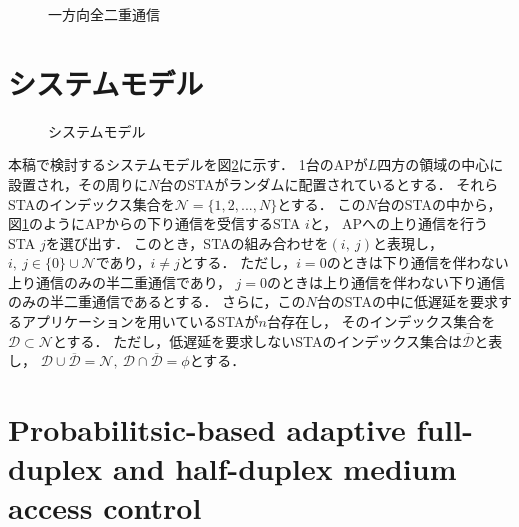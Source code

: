 \documentclass[technicalreport]{ieicej}
\newcommand{\sij}{(i,\ j)}
\newcommand{\mN}{{\mathcal N}}
\begin{document}
	\begin{figure}[t]
		\centering
		\caption{一方向全二重通信}
		\label{fig:topology}
	\end{figure}

\section{システムモデル}
	\begin{figure}[t]
		\centering
		\caption{システムモデル}
		\label{fig:model}
	\end{figure}

	本稿で検討するシステムモデルを図\ref{fig:model}に示す．
	1台のAPが$L$四方の領域の中心に設置され，その周りに$N$台のSTAがランダムに配置されているとする．
	それらSTAのインデックス集合を$\mN=\{1,2,...,N\}$とする．
	この$N$台のSTAの中から，図\ref{fig:topology}のようにAPからの下り通信を受信するSTA $i$と，
	APへの上り通信を行うSTA $j$を選び出す．
	このとき，STAの組み合わせを$\sij$と表現し，$i,\ j \in \{0\}\cup \mN$であり，$i\neq j$とする．
	ただし，$i=0$のときは下り通信を伴わない上り通信のみの半二重通信であり，
	$j=0$のときは上り通信を伴わない下り通信のみの半二重通信であるとする．
	さらに，この$N$台のSTAの中に低遅延を要求するアプリケーションを用いているSTAが$n$台存在し，
	そのインデックス集合を${\mathcal D}\subset\mN$とする．
	ただし，低遅延を要求しないSTAのインデックス集合は${\overline {\mathcal D}}$と表し，
	${\mathcal D} \cup {\overline {\mathcal D}}=\mN,\ {\mathcal D} \cap {\overline {\mathcal D}}=\phi$とする．

\section{Probabilitsic-based adaptive full-duplex and half-duplex medium access control}
\end{document}
